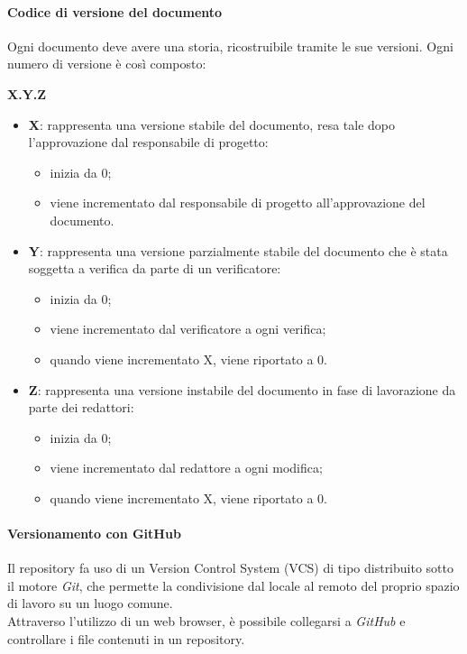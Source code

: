 			\paragraph{Codice di versione del documento}
			Ogni documento deve avere una storia, ricostruibile tramite le sue versioni. Ogni numero di versione è così composto:\\
			\centerline{\textbf{X.Y.Z}}
			\begin{itemize}
			\item \textbf{X}: rappresenta una versione stabile del documento, resa tale dopo l'approvazione dal responsabile di progetto:
				\begin{itemize}
		   			\item inizia da 0;
		   			\item viene incrementato dal responsabile di progetto all'approvazione del documento.
		  		\end{itemize}
		  	\item \textbf{Y}: rappresenta una versione parzialmente stabile del documento che è stata soggetta a verifica da parte di un verificatore:
		  		\begin{itemize}
		   			\item inizia da 0;
		   			\item viene incrementato dal verificatore a ogni verifica; 
		   			\item quando viene incrementato X, viene riportato a 0.
		   		\end{itemize}
		   	\item \textbf{Z}: rappresenta una versione instabile del documento in fase di lavorazione da parte dei redattori:
		   		\begin{itemize}
		   			\item inizia da 0;
		   			\item viene incrementato dal redattore a ogni modifica; 
		   			\item quando viene incrementato X, viene riportato a 0.
		   		\end{itemize}
			\end{itemize}
			
			\paragraph{Versionamento con GitHub}
	Il repository fa uso di un Version Control System (VCS) di tipo distribuito sotto il motore \textit{Git}, che permette la condivisione dal locale al remoto del proprio spazio di lavoro su un luogo comune.\\
		Attraverso l'utilizzo di un web browser, è possibile collegarsi a \textit{GitHub} e controllare i file contenuti in un repository. 
